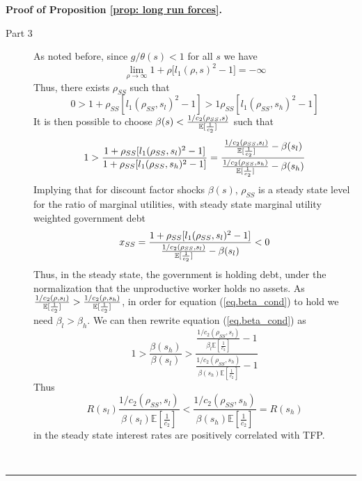 \documentclass[thmsb,11pt]{article}
\newenvironment{proof}[1][Proof]{\noindent \textbf{#1.} }{\  \rule{0.5em}{0.5em}}
\begin{document}
\begin{appendix}
\begin{proof}[Proof of Proposition \ref{prop: long run forces}]
\begin{description}
\item[Part 3] As noted before, since $g/\theta (s)<1$ for all $s$ we have
\begin{equation*}
\lim_{\rho \rightarrow \infty }1+\rho \lbrack l_{1}(\rho ,s)^{2}-1]=-\infty
\end{equation*}%
Thus, there exists $\rho_{SS}$ such that
\begin{equation*}
0>1+\rho_{SS}[l_{1}(\rho_{SS},s_{l})^{2}-1]>1\rho_{SS}[l_{1}(\rho_{SS},s_{h})^{2}-1]
\end{equation*}%
It is then possible to choose $\beta (s)<\frac{1/c_{2}(\rho_{SS},s)}{%
\mathbb{E}[\frac{1}{c_{2}}]}$ such that
\begin{equation}
1>\frac{1+\rho_{SS}[l_{1}(\rho_{SS},s_{l})^{2}-1]}{1+\rho_{SS}[l_{1}(\rho_{SS},s_{h})^{2}-1]}=\frac{\frac{1/c_{2}(\rho_{SS},s_{l})%
}{\mathbb{E}[\frac{1}{c_{2}}]}-\beta (s_{l})}{\frac{%
1/c_{2}(\rho_{SS},s_{h})}{\mathbb{E}[\frac{1}{c_{2}}]}%
-\beta (s_{h})}  \label{eq.beta_cond}
\end{equation}%
Implying that for discount factor shocks $\beta (s)$, $\rho_{SS}$ is a
steady state level for the ratio of marginal utilities, with steady state
marginal utility weighted government debt
\begin{equation*}
x_{SS}=\frac{1+\rho_{SS}[l_{1}(\rho_{SS},s_{l})^{2}-1]}{\frac{%
1/c_{2}(\rho_{SS},s_{l})}{\mathbb{E}[\frac{1}{c_{2}}]}%
-\beta (s_{l})}<0
\end{equation*}%
Thus, in the steady state, the government is holding debt, under the
normalization that the unproductive worker holds no assets. As $\frac{%
1/c_{2}(\rho ,s_{l})}{\mathbb{E}[\frac{1}{c_{2}}]}>\frac{1/c_{2}(\rho
,s_{h})}{\mathbb{E}[\frac{1}{c_{2}}]}$, in order for equation (\ref{eq.beta_cond}) to hold we need $\beta _{l}>\beta _{h}$. We can then rewrite
equation (\ref{eq.beta_cond}) as
\begin{equation*}
1>\frac{\beta (s_{h})}{\beta (s_{l})}>\frac{\frac{1/c_{2}(\rho_{SS},s_{l})}{\beta
_{l}\mathbb{E}[\frac{1}{c_{2}}]}-1}{\frac{1/c_{2}(\rho_{SS} ,s_{h})}{\beta
(s_{h})\mathbb{E}[\frac{1}{c_{2}}]}-1}
\end{equation*}%
Thus
\begin{equation}
R(s_{l})\frac{1/c_{2}(\rho_{SS} ,s_{l})}{\beta (s_{l})\mathbb{E}[\frac{1}{c_{2}}%
]}<\frac{1/c_{2}(\rho_{SS} ,s_{h})}{\beta (s_{h})\mathbb{E}[\frac{1}{c_{2}}%
]}=R(s_{h})
\end{equation}%
in the steady state interest rates are positively correlated with TFP.
\end{description}
\end{proof}


\end{appendix}
\end{document}
